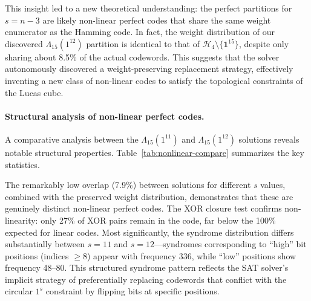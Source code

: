 This insight led to a new theoretical understanding: the perfect partitions for $s=n-3$ are likely non-linear perfect codes that share the same weight enumerator as the Hamming code. In fact, the weight distribution of our discovered $\Lambda_{15}(1^{12})$ partition is identical to that of $\mathcal{H}_4 \setminus \{\mathbf{1}^{15}\}$, despite only sharing about 8.5\% of the actual codewords. This suggests that the solver autonomously discovered a weight-preserving replacement strategy, effectively inventing a new class of non-linear codes to satisfy the topological constraints of the Lucas cube.

\paragraph{Structural analysis of non-linear perfect codes.}
A comparative analysis between the $\Lambda_{15}(1^{11})$ and $\Lambda_{15}(1^{12})$ solutions reveals notable structural properties. Table~\ref{tab:nonlinear-compare} summarizes the key statistics.

\begin{table}[h!]
\centering
\footnotesize
\caption{Structural comparison of SAT-discovered perfect partitions in $\Lambda_{15}(1^s)$.}
\label{tab:nonlinear-compare}
\end{table}

\noindent The remarkably low overlap (7.9\%) between solutions for different $s$ values, combined with the preserved weight distribution, demonstrates that these are genuinely distinct non-linear perfect codes. The XOR closure test confirms non-linearity: only 27\% of XOR pairs remain in the code, far below the 100\% expected for linear codes. Most significantly, the syndrome distribution differs substantially between $s=11$ and $s=12$---syndromes corresponding to ``high'' bit positions (indices $\geq 8$) appear with frequency 336, while ``low'' positions show frequency 48--80. This structured syndrome pattern reflects the SAT solver's implicit strategy of preferentially replacing codewords that conflict with the circular $1^s$ constraint by flipping bits at specific positions.

